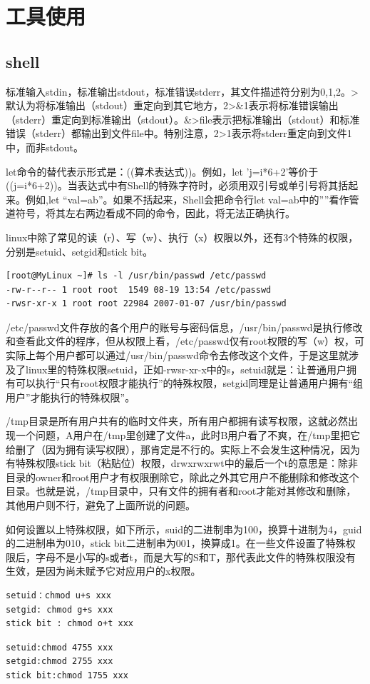 \section{工具使用}
\subsection{shell}
\par 标准输入stdin，标准输出stdout，标准错误stderr，其文件描述符分别为0,1,2。>默认为将标准输出（stdout）重定向到其它地方，2>\&1表示将标准错误输出（stderr）重定向到标准输出（stdout）。\&>file表示把标准输出（stdout）和标准错误（stderr）都输出到文件file中。特别注意，2>1表示将stderr重定向到文件1中，而非stdout。
\par let命令的替代表示形式是：((算术表达式))。例如，let 'j=i*6+2'等价于((j=i*6+2))。当表达式中有Shell的特殊字符时，必须用双引号或单引号将其括起来。例如,let ``val=a\textbar b''。如果不括起来，Shell会把命令行let val=a\textbar b中的''\textbar''看作管道符号，将其左右两边看成不同的命令，因此，将无法正确执行。 
\par linux中除了常见的读（r）、写（w）、执行（x）权限以外，还有3个特殊的权限，分别是setuid、setgid和stick bit。
\begin{verbatim}
[root@MyLinux ~]# ls -l /usr/bin/passwd /etc/passwd
-rw-r--r-- 1 root root  1549 08-19 13:54 /etc/passwd
-rwsr-xr-x 1 root root 22984 2007-01-07 /usr/bin/passwd
\end{verbatim}
\par /etc/passwd文件存放的各个用户的账号与密码信息，/usr/bin/passwd是执行修改和查看此文件的程序，但从权限上看，/etc/passwd仅有root权限的写（w）权，可实际上每个用户都可以通过/usr/bin/passwd命令去修改这个文件，于是这里就涉及了linux里的特殊权限setuid，正如-rwsr-xr-x中的s，setuid就是：让普通用户拥有可以执行“只有root权限才能执行”的特殊权限，setgid同理是让普通用户拥有“组用户”才能执行的特殊权限”。
\par /tmp目录是所有用户共有的临时文件夹，所有用户都拥有读写权限，这就必然出现一个问题，A用户在/tmp里创建了文件a，此时B用户看了不爽，在/tmp里把它给删了（因为拥有读写权限），那肯定是不行的。实际上不会发生这种情况，因为有特殊权限stick bit（粘贴位）权限，drwxrwxrwt中的最后一个t的意思是：除非目录的owner和root用户才有权限删除它，除此之外其它用户不能删除和修改这个目录。也就是说，/tmp目录中，只有文件的拥有者和root才能对其修改和删除，其他用户则不行，避免了上面所说的问题。
\par 如何设置以上特殊权限，如下所示，suid的二进制串为100，换算十进制为4，guid的二进制串为010，stick bit二进制串为001，换算成1。在一些文件设置了特殊权限后，字母不是小写的s或者t，而是大写的S和T，那代表此文件的特殊权限没有生效，是因为尚未赋予它对应用户的x权限。\\
\begin{minipage}{.5\linewidth}
\begin{verbatim}
setuid：chmod u+s xxx
setgid: chmod g+s xxx
stick bit : chmod o+t xxx
\end{verbatim}  
\end{minipage}
\begin{minipage}{.5\linewidth}
\begin{verbatim}
setuid:chmod 4755 xxx
setgid:chmod 2755 xxx
stick bit:chmod 1755 xxx
\end{verbatim}  
\end{minipage}

